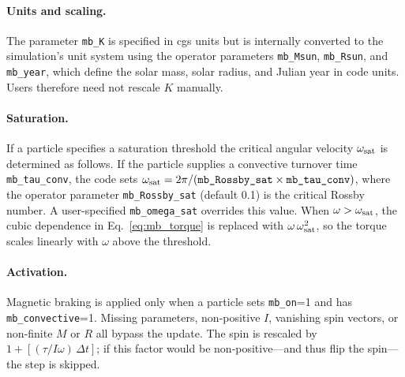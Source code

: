 \documentclass[11pt]{article}
\begin{document}
\paragraph{Units and scaling.} The parameter \texttt{mb\_K} is specified in cgs
units but is internally converted to the simulation's unit system using the
operator parameters \texttt{mb\_Msun}, \texttt{mb\_Rsun}, and \texttt{mb\_year},
which define the solar mass, solar radius, and Julian year in code units.
Users therefore need not rescale $K$ manually.

\paragraph{Saturation.} If a particle specifies a saturation threshold
the critical angular velocity $\omega_{\rm sat}$ is determined as follows.
If the particle supplies a convective turnover time \texttt{mb\_tau\_conv}, the
code sets $\omega_{\rm sat}=2\pi/(\texttt{mb\_Rossby\_sat}\times\texttt{mb\_tau\_conv})$,
where the operator parameter \texttt{mb\_Rossby\_sat} (default 0.1) is the
critical Rossby number.  A user-specified \texttt{mb\_omega\_sat} overrides this
value.  When $\omega>\omega_{\rm sat}$, the cubic dependence in
Eq.~\eqref{eq:mb_torque} is replaced with $\omega\,\omega_{\rm sat}^2$, so the
torque scales linearly with $\omega$ above the threshold.

\paragraph{Activation.} Magnetic braking is applied only when a particle sets
\texttt{mb\_on}=1 and has \texttt{mb\_convective}=1. Missing parameters,
non‑positive $I$, vanishing spin vectors, or non‑finite $M$ or $R$ all
bypass the update.  The spin is rescaled by $1+[(\tau/I\omega)\,\Delta t]$;
if this factor would be non‑positive—and thus flip the spin—the step is
skipped.
\end{document}
